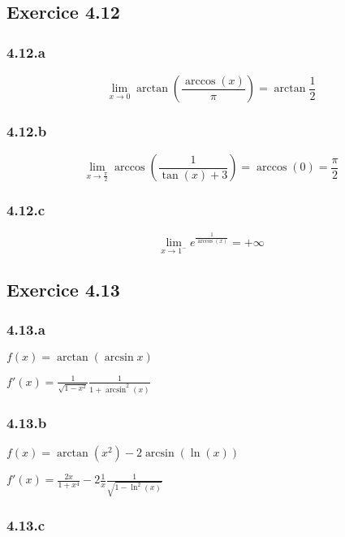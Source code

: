 \documentclass[a4paper,10pt]{report}
\begin{document}
\subsection*{Exercice 4.12}

\subsubsection*{4.12.a}
\begin{displaymath}
	\lim_{x \rightarrow 0} \arctan \left( \frac{\arccos(x)}{\pi} \right) = \arctan \frac{1}{2}
\end{displaymath}

\subsubsection*{4.12.b}
\begin{displaymath}
	\lim_{x \rightarrow \frac{\pi}{2}} \arccos \left( \frac{1}{\tan(x) +3} \right) = \arccos(0) = \frac{\pi}{2}
\end{displaymath}

\subsubsection*{4.12.c}
\begin{displaymath}
	\lim_{x \rightarrow 1^-} e^{\frac{1}{\arccos(x)}} = +\infty
\end{displaymath}

\subsection*{Exercice 4.13}
\subsubsection*{4.13.a}

$f(x) = \arctan(\arcsin x)$

$f'(x) = \frac{1}{\sqrt{1-x^2}}\frac{1}{1+\arcsin^2(x)}$


\subsubsection*{4.13.b}

$f(x) = \arctan(x^2) -2 \arcsin(\ln(x)) $

$f'(x) = \frac{2x}{1+x^4} - 2 \frac{1}{x}\frac{1}{\sqrt{1-\ln^2(x)}}$

\subsubsection*{4.13.c}
\end{document}
